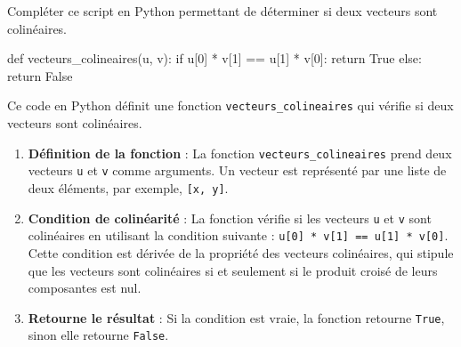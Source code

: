 \documentclass[a4paper]{article}
\begin{document}
    \begin{exercice}{}{}
    Compléter ce script en Python permettant de déterminer si deux vecteurs sont colinéaires.
      \begin{center}
        \begin{CodePythontex}[Largeur=0.75\linewidth, Centre, Lignes=false]{}
          def vecteurs_colineaires(u, v):
          if u[0] * v[1] == u[1] * v[0]:
            return True
          else:
            return False
          \end{CodePythontex}
      \end{center}


      Ce code en Python définit une fonction \texttt{vecteurs\_colineaires} qui vérifie si deux vecteurs sont colinéaires. 

\begin{enumerate}
    \item \textbf{Définition de la fonction} : La fonction \texttt{vecteurs\_colineaires} prend deux vecteurs \texttt{u} et \texttt{v} comme arguments. Un vecteur est représenté par une liste de deux éléments, par exemple, \texttt{[x, y]}.
    \item \textbf{Condition de colinéarité} : La fonction vérifie si les vecteurs \texttt{u} et \texttt{v} sont colinéaires en utilisant la condition suivante : \texttt{u[0] * v[1] == u[1] * v[0]}. Cette condition est dérivée de la propriété des vecteurs colinéaires, qui stipule que les vecteurs sont colinéaires si et seulement si le produit croisé de leurs composantes est nul.
    \item \textbf{Retourne le résultat} : Si la condition est vraie, la fonction retourne \texttt{True}, sinon elle retourne \texttt{False}.
\end{enumerate}

    \end{exercice}
\end{document}
